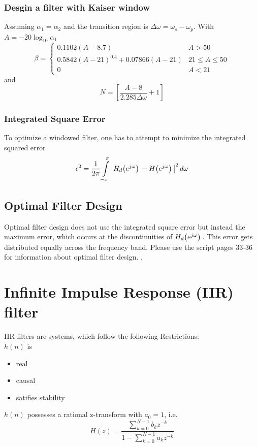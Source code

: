 \documentclass[accentcolor=tud4c,9.5pt,nochapname,bigchapter,paper=a5report]{tudreport}
\begin{document}
\subsubsection{Desgin a filter with Kaiser window}
Assuming $\alpha_1 = \alpha_2$ and the transition region is $\Delta\omega = \omega_s-\omega_p$. With $A = -20\log_{10}\alpha_1$
\begin{equation}
\beta = \begin{cases}
0.1102(A-8.7) &A>50 \\
0.5842(A-21)^{0.4}+0.07866(A-21) &21\leq A \leq 50 \\
0 &A<21
\end{cases}
\end{equation}
and
\begin{equation}
N=\left[\frac{A-8}{2.285\Delta\omega}+1\right]
\end{equation}
\subsubsection{Integrated Square Error}
To optimize a windowed filter, one has to attempt to minimize the integrated squared error
\begin{equation}
\epsilon^2=\frac{1}{2\pi}\int\limits_{-\pi}^{\pi}\left|H_d{\left(e^{j\omega}\right)}\, - H{\left(e^{j\omega}\right)}\,\right|^2 d\omega
\end{equation}

\subsection{Optimal Filter Design}
Optimal filter design does not use the integrated square error but instead the maximum error, which occurs at the discontinuities of $H_d{\left(e^{j\omega}\right)}\,$.
This error gets distributed equally across the frequency band.
Please use the script pages 33-36 for information about optimal filter design.
,

\section{Infinite Impulse Response (IIR) filter}
IIR filters are systems, which follow the following Restrictions:\\
$h(n)$ is
  \begin{itemize}
  	\item real
  	\item causal
  	\item satifies stability
  \end{itemize}
$h(n)$ possesses a rational z-transform with $a_0=1$, i.e.
\begin{equation}
  	H(z)=\frac{\sum\limits_{k=0}^{N-1} b_k z^{-k}}{1-\sum\limits_{k=0}^{N-1} a_k z^{-k}}
\end{equation}
  
\end{document}
